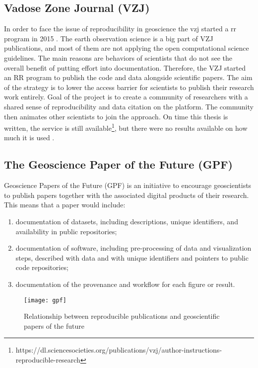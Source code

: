 \documentclass[draft,final]{vutinfth} %
\begin{document}
\subsection{Vadose Zone Journal (VZJ)}\label{VZJ}
In order to face the issue of reproducibility in geoscience the \gls{vzj} started a \gls{rr} program in 2015 \cite{doi:10.2136/vzj2015.06.0088}. 
The earth observation science is a big part of VZJ publications, and most of them are not applying the open computational science guidelines. The main reasons are behaviors of scientists that do not see the overall benefit of putting effort into documentation. Therefore, the VZJ started an RR program to publish the code and data alongside scientific papers. The aim of the strategy is to lower the access barrier for scientists to publish their research work entirely. Goal of the project is to create a community of researchers with a shared sense of reproducibility and data citation on the platform. The community then animates other scientists to join the approach. On time this thesis is written, the service is still available\footnote{https://dl.sciencesocieties.org/publications/vzj/author-instructions-reproducible-research}, but there were no results available on how much it is used \cite{doi:10.2136/vzj2015.06.0088}.

\subsection{The Geoscience Paper of the Future (GPF)}\label{GPF}

Geoscience Papers of the Future (GPF) \cite{Gil2016TowardTG}  is an initiative to encourage geoscientists to publish papers together with the associated digital products of their research. This means that a paper would include: 

\begin{enumerate}
	\item documentation of datasets, including descriptions, unique identifiers, and availability in public repositories; 
	\item documentation of software, including pre-processing of data and visualization steps, described with data and with unique identifiers and pointers to public code repositories; 
	\item documentation of the provenance and workflow for each figure or result.
\end{enumerate}

\begin{figure}[h]
	\centering
	\texttt{[image: gpf]}
	\caption{Relationship between reproducible publications and geoscientific papers of the future \cite{Gil2016TowardTG}}
	\label{fig:gpf} %
\end{figure}
\end{document}
